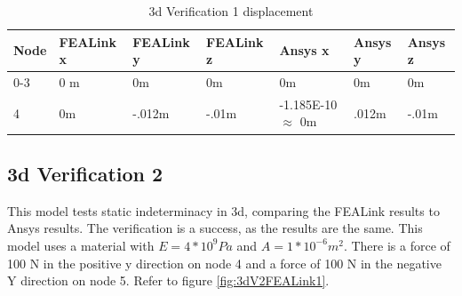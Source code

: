 \documentclass[11pt, oneside]{article}   	%
\begin{document}
\begin{table}[h]
\centering
 \caption{3d Verification 1 displacement}
 \label{table:3dV1}
 \begin{tabular}{l|l|l|l|l|l|l}
 Node & FEALink x           & FEALink y & FEALink z & Ansys x    & Ansys y & Ansys z \\ \hline
 0-3  & 0 m                  & 0m         & 0m         & 0m          & 0m       & 0m       \\
 4     & 0m                   & -.012m     & -.01m      & -1.185E-10 $\approx$ 0m & .012m    & -.01m  
 \end{tabular}
\end{table}


\subsection{3d Verification 2}
This model tests static indeterminacy in 3d, comparing the FEALink results to Ansys results.  The verification is a success, as the results are the same.  This model uses a material with $E = 4*10^9 Pa$ and $A = 1*10^{-6} m^2$.  There is a force of 100 N in the positive y direction on node 4 and a force of 100 N in the negative Y direction on node 5.  Refer to figure \ref{fig:3dV2FEALink1}.
\end{document}

